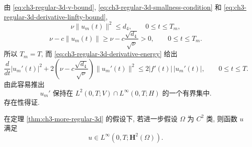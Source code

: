 \begin{Proof}
\hypertarget{chapter-03-page-222}{}
由 \eqref{eq:ch3-regular-3d-v-bound}, \eqref{eq:ch3-regular-3d-smallness-condition} 和 \eqref{eq:ch3-regular-3d-derivative-linfty-bound},
\[
\nu\lVert u_m(t)\rVert^2\leq d_4,
\qquad0\leq t\leq T_m,
\]
\begin{equation}
\nu-c\lVert u_m(t)\rVert
\geq\nu-c\frac{\sqrt{d_4}}{\sqrt\nu}>0,
\qquad0\leq t\leq T_m.
\label{eq:ch3-regular-3d-coercivity-positive}
\end{equation}
所以 $T_m=T$, 而 \eqref{eq:ch3-regular-3d-derivative-energy} 给出
\[
\frac d{dt}|u_m'(t)|^2
+2\left(\nu-c\frac{\sqrt{d_4}}{\sqrt\nu}\right)
\lVert u_m'(t)\rVert^2
\leq2|f'(t)|\,|u_m'(t)|,
\qquad0\leq t\leq T.
\]
由此容易推出
\begin{equation}
u_m'\text{ 保持在 }L^2(0,T;V)\cap L^\infty(0,T;H)\text{ 的一个有界集中}.
\label{eq:ch3-regular-3d-galerkin-derivative-boundedness}
\end{equation}
存在性得证.
\end{Proof}

\begin{Theorem}
\label{thm:ch3-regular-3d-h2}
在定理 \ref{thm:ch3-more-regular-3d} 的假设下, 若进一步假设 $\Omega$ 为 $C^2$ 类, 则函数 $u$ 满足
\begin{equation}
u\in L^\infty(0,T;\mathbf H^2(\Omega)).
\label{eq:ch3-regular-3d-h2-linfty}
\end{equation}
\end{Theorem}

